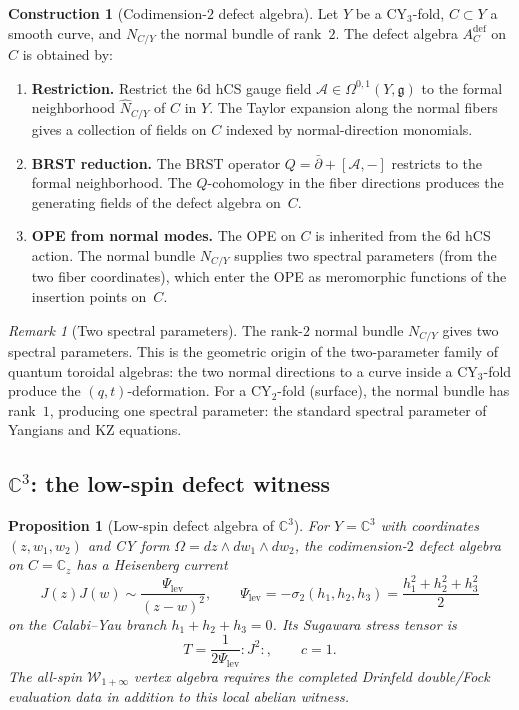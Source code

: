 \documentclass[11pt]{article}
\theoremstyle{plain}
\newtheorem{proposition}[theorem]{Proposition}
\theoremstyle{definition}
\newtheorem{construction}[theorem]{Construction}
\theoremstyle{remark}
\newtheorem{remark}[theorem]{Remark}
\newcommand{\fg}{\mathfrak{g}}
\newcommand{\cA}{\mathcal{A}}
\newcommand{\cW}{\mathcal{W}}
\newcommand{\bC}{\mathbb{C}}
\newcommand{\BRST}{\mathrm{BRST}}
\begin{document}
\begin{construction}[Codimension-$2$ defect algebra]
\label{con:v3-qg-codim2}
Let $Y$ be a CY$_3$-fold, $C \subset Y$ a smooth curve, and
$N_{C/Y}$ the normal bundle of rank~$2$.  The defect algebra
$A_C^{\mathrm{def}}$ on $C$ is obtained by:
\begin{enumerate}[label=\textbf{\arabic*.}]
 \item \textbf{Restriction.}  Restrict the $6$d hCS gauge field
 $\cA \in \Omega^{0,1}(Y, \fg)$ to the formal neighborhood
 $\hat{N}_{C/Y}$ of $C$ in $Y$.  The Taylor expansion along the
 normal fibers gives a collection of fields on $C$ indexed by
 normal-direction monomials.
 \item \textbf{BRST reduction.}  The $\BRST$ operator
 $Q = \bar\partial + [\cA, -]$ restricts to the formal
 neighborhood.  The $Q$-cohomology in the fiber directions
 produces the generating fields of the defect algebra on~$C$.
 \item \textbf{OPE from normal modes.}  The OPE on $C$ is
 inherited from the $6$d hCS action.  The normal bundle
 $N_{C/Y}$ supplies two spectral parameters (from the two fiber
 coordinates), which enter the OPE as meromorphic functions of
 the insertion points on~$C$.
\end{enumerate}
\end{construction}

\begin{remark}[Two spectral parameters]
\label{rem:v3-qg-two-spectral}
The rank-$2$ normal bundle $N_{C/Y}$ gives two spectral parameters.
This is the geometric origin of the two-parameter family of quantum
toroidal algebras: the two normal directions to a curve inside a
CY$_3$-fold produce the $(q,t)$-deformation.  For a CY$_2$-fold
(surface), the normal bundle has rank~$1$, producing one spectral
parameter: the standard spectral parameter of Yangians and
KZ equations.
\end{remark}

\subsection{$\bC^3$: the low-spin defect witness}

\begin{proposition}[Low-spin defect algebra of $\bC^3$]
\label{prop:v3-qg-c3-defect}
For $Y = \bC^3$ with coordinates $(z, w_1, w_2)$ and CY form
$\Omega = dz \wedge dw_1 \wedge dw_2$, the codimension-$2$ defect
algebra on $C = \bC_z$ has a Heisenberg current
\[
J(z)J(w)\sim \frac{\Psi_{\mathrm{lev}}}{(z-w)^2},
\qquad
\Psi_{\mathrm{lev}}=-\sigma_2(h_1,h_2,h_3)
=\frac{h_1^2+h_2^2+h_3^2}{2}
\]
on the Calabi--Yau branch $h_1+h_2+h_3=0$. Its Sugawara stress
tensor is
\[
T=\frac{1}{2\Psi_{\mathrm{lev}}}{:}J^2{:},\qquad c=1.
\]
The all-spin $\cW_{1+\infty}$ vertex algebra requires the completed
Drinfeld double/Fock evaluation data in addition to this local
abelian witness.
\end{proposition}
\end{document}
